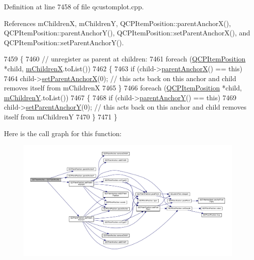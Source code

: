 Definition at line 7458 of file qcustomplot.\+cpp.



References m\+Children\+X, m\+Children\+Y, Q\+C\+P\+Item\+Position\+::parent\+Anchor\+X(), Q\+C\+P\+Item\+Position\+::parent\+Anchor\+Y(), Q\+C\+P\+Item\+Position\+::set\+Parent\+Anchor\+X(), and Q\+C\+P\+Item\+Position\+::set\+Parent\+Anchor\+Y().


\begin{DoxyCode}
7459 \{
7460   \textcolor{comment}{// unregister as parent at children:}
7461   \textcolor{keywordflow}{foreach} (\hyperlink{class_q_c_p_item_position}{QCPItemPosition} *child, \hyperlink{class_q_c_p_item_anchor_a3c0bfd6e50f3b48e2a9b3824695b20f7}{mChildrenX}.toList())
7462   \{
7463     \textcolor{keywordflow}{if} (child->\hyperlink{class_q_c_p_item_position_a485abba71c8552086c5f68e95dca7f9a}{parentAnchorX}() == \textcolor{keyword}{this})
7464       child->\hyperlink{class_q_c_p_item_position_add71461a973927c74e42179480916d9c}{setParentAnchorX}(0); \textcolor{comment}{// this acts back on this anchor and child removes itself
       from mChildrenX}
7465   \}
7466   \textcolor{keywordflow}{foreach} (\hyperlink{class_q_c_p_item_position}{QCPItemPosition} *child, \hyperlink{class_q_c_p_item_anchor_a3abe4eebd0683454d81c8341df6f7115}{mChildrenY}.toList())
7467   \{
7468     \textcolor{keywordflow}{if} (child->\hyperlink{class_q_c_p_item_position_a1502dba801cb20424b7e097399e372de}{parentAnchorY}() == \textcolor{keyword}{this})
7469       child->\hyperlink{class_q_c_p_item_position_add5ec1db9d19cec58a3b5c9e0a0c3f9d}{setParentAnchorY}(0); \textcolor{comment}{// this acts back on this anchor and child removes itself
       from mChildrenY}
7470   \}
7471 \}
\end{DoxyCode}


Here is the call graph for this function\+:\nopagebreak
\begin{figure}[H]
\begin{center}
\leavevmode
\includegraphics[width=350pt]{class_q_c_p_item_anchor_a1868559407600688ee4d1a4621e81ceb_cgraph}
\end{center}
\end{figure}





